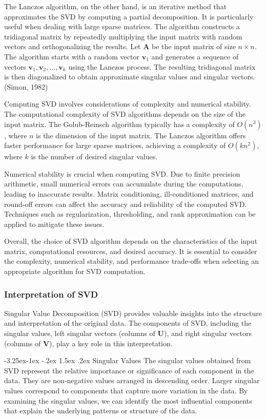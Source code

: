 \documentclass[a4paper]{article}
\makeatletter
\newcounter {subsubsubsection}[subsubsection]
\newcommand\subsubsubsection{\@startsection{subsubsubsection}{4}{\z@}%
	{-3.25ex\@plus -1ex \@minus -.2ex}%
	{1.5ex \@plus .2ex}%
	{\normalfont\normalsize\bfseries}}
\makeatother
\begin{document}
{		The Lanczos algorithm, on the other hand, is an iterative method that approximates the SVD by computing a partial decomposition. It is particularly useful when dealing with large sparse matrices. The algorithm constructs a tridiagonal matrix by repeatedly multiplying the input matrix with random vectors and orthogonalizing the results. Let $\mathbf{A}$ be the input matrix of size $n \times n$. The algorithm starts with a random vector $\mathbf{v}_1$ and generates a sequence of vectors $\mathbf{v}_1, \mathbf{v}_2, \ldots, \mathbf{v}_k$ using the Lanczos process. The resulting tridiagonal matrix is then diagonalized to obtain approximate singular values and singular vectors. (Simon, 1982)
		
		Computing SVD involves considerations of complexity and numerical stability. The computational complexity of SVD algorithms depends on the size of the input matrix. The Golub-Reinsch algorithm typically has a complexity of $O(n^3)$, where $n$ is the dimension of the input matrix. The Lanczos algorithm offers faster performance for large sparse matrices, achieving a complexity of $O(kn^2)$, where $k$ is the number of desired singular values.
		
		Numerical stability is crucial when computing SVD. Due to finite precision arithmetic, small numerical errors can accumulate during the computations, leading to inaccurate results. Matrix conditioning, ill-conditioned matrices, and round-off errors can affect the accuracy and reliability of the computed SVD. Techniques such as regularization, thresholding, and rank approximation can be applied to mitigate these issues.
		
		Overall, the choice of SVD algorithm depends on the characteristics of the input matrix, computational resources, and desired accuracy. It is essential to consider the complexity, numerical stability, and performance trade-offs when selecting an appropriate algorithm for SVD computation.
		
		\subsubsection{Interpretation of SVD}
		Singular Value Decomposition (SVD) provides valuable insights into the structure and interpretation of the original data. The components of SVD, including the singular values, left singular vectors (columns of $\mathbf{U}$), and right singular vectors (columns of $\mathbf{V}$), play a key role in this interpretation.
		
		\subsubsubsection{Singular Values}
		The singular values obtained from SVD represent the relative importance or significance of each component in the data. They are non-negative values arranged in descending order. Larger singular values correspond to components that capture more variation in the data. By examining the singular values, we can identify the most influential components that explain the underlying patterns or structure of the data.
		
}
\end{document}
